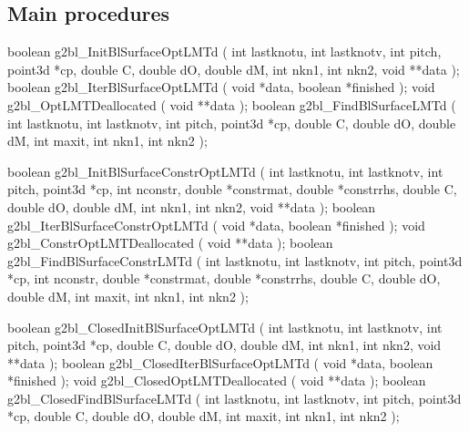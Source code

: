 \subsection{Main procedures}

\begin{listingC}
boolean g2bl_InitBlSurfaceOptLMTd ( int lastknotu, int lastknotv,
                        int pitch, point3d *cp,
                        double C, double dO, double dM,
                        int nkn1, int nkn2,
                        void **data );
boolean g2bl_IterBlSurfaceOptLMTd ( void *data, boolean *finished );
void g2bl_OptLMTDeallocated ( void **data );
boolean g2bl_FindBlSurfaceLMTd ( int lastknotu, int lastknotv,
                        int pitch, point3d *cp,
                        double C, double dO, double dM,
                        int maxit, int nkn1, int nkn2 );
\end{listingC}

\medskip
\begin{listingC}
boolean g2bl_InitBlSurfaceConstrOptLMTd (
                       int lastknotu, int lastknotv, int pitch,
                       point3d *cp,
                       int nconstr, double *constrmat,
                       double *constrrhs,
                       double C, double dO, double dM,
                       int nkn1, int nkn2,
                       void **data );
boolean g2bl_IterBlSurfaceConstrOptLMTd ( void *data,
                       boolean *finished );
void g2bl_ConstrOptLMTDeallocated ( void **data );
boolean g2bl_FindBlSurfaceConstrLMTd (
                       int lastknotu, int lastknotv, int pitch,
                       point3d *cp,
                       int nconstr, double *constrmat,
                       double *constrrhs,
                       double C, double dO, double dM,
                       int maxit, int nkn1, int nkn2 );
\end{listingC}

\medskip
\begin{listingC}
boolean g2bl_ClosedInitBlSurfaceOptLMTd (
                       int lastknotu, int lastknotv, int pitch,
                       point3d *cp,
                       double C, double dO, double dM,
                       int nkn1, int nkn2,
                       void **data );
boolean g2bl_ClosedIterBlSurfaceOptLMTd ( void *data,
                       boolean *finished );
void g2bl_ClosedOptLMTDeallocated ( void **data );
boolean g2bl_ClosedFindBlSurfaceLMTd (
                       int lastknotu, int lastknotv, int pitch,
                       point3d *cp,
                       double C, double dO, double dM,
                       int maxit, int nkn1, int nkn2 );
\end{listingC}

